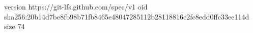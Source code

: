 version https://git-lfs.github.com/spec/v1
oid sha256:20b14d7be8fb98b71fb8465e48047285112b28118816c2fc8edd0ffc33ee114d
size 74

